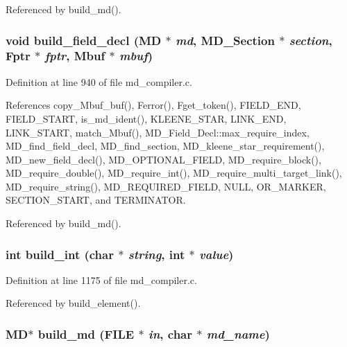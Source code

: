 Referenced by build\_\-md().
\subsubsection{\setlength{\rightskip}{0pt plus 5cm}void build\_\-field\_\-decl (\bf{MD} $\ast$ {\em md}, \bf{MD\_\-Section} $\ast$ {\em section}, \bf{Fptr} $\ast$ {\em fptr}, \bf{Mbuf} $\ast$ {\em mbuf})}\label{md__compiler_8c_0449f410c0cc6716a3783605146dcaf9}




Definition at line 940 of file md\_\-compiler.c.

References copy\_\-Mbuf\_\-buf(), Ferror(), Fget\_\-token(), FIELD\_\-END, FIELD\_\-START, is\_\-md\_\-ident(), KLEENE\_\-STAR, LINK\_\-END, LINK\_\-START, match\_\-Mbuf(), MD\_\-Field\_\-Decl::max\_\-require\_\-index, MD\_\-find\_\-field\_\-decl, MD\_\-find\_\-section, MD\_\-kleene\_\-star\_\-requirement(), MD\_\-new\_\-field\_\-decl(), MD\_\-OPTIONAL\_\-FIELD, MD\_\-require\_\-block(), MD\_\-require\_\-double(), MD\_\-require\_\-int(), MD\_\-require\_\-multi\_\-target\_\-link(), MD\_\-require\_\-string(), MD\_\-REQUIRED\_\-FIELD, NULL, OR\_\-MARKER, SECTION\_\-START, and TERMINATOR.

Referenced by build\_\-md().
\subsubsection{\setlength{\rightskip}{0pt plus 5cm}int build\_\-int (char $\ast$ {\em string}, int $\ast$ {\em value})}\label{md__compiler_8c_d0b32dcf1d402933ef74da0913f1ae56}




Definition at line 1175 of file md\_\-compiler.c.

Referenced by build\_\-element().
\subsubsection{\setlength{\rightskip}{0pt plus 5cm}\bf{MD}$\ast$ build\_\-md (FILE $\ast$ {\em in}, char $\ast$ {\em md\_\-name})}\label{md__compiler_8c_90fa8dea05b29f1ac530a80fb360bdf8}




